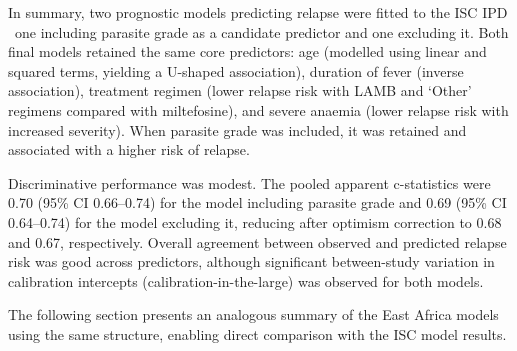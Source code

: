 In summary, two prognostic models predicting relapse were fitted to the ISC IPD \textemdash\ one including parasite grade as a candidate predictor and one excluding it. Both final models retained the same core predictors: age (modelled using linear and squared terms, yielding a U-shaped association), duration of fever (inverse association), treatment regimen (lower relapse risk with LAMB and `Other' regimens compared with miltefosine), and severe anaemia (lower relapse risk with increased severity). When parasite grade was included, it was retained and associated with a higher risk of relapse.

Discriminative performance was modest. The pooled apparent c-statistics were 0.70 (95\% CI 0.66--0.74) for the model including parasite grade and 0.69 (95\% CI 0.64--0.74) for the model excluding it, reducing after optimism correction to 0.68 and 0.67, respectively. Overall agreement between observed and predicted relapse risk was good across predictors, although significant between-study variation in calibration intercepts (calibration-in-the-large) was observed for both models.

The following section presents an analogous summary of the East Africa models using the same structure, enabling direct comparison with the ISC model results.
